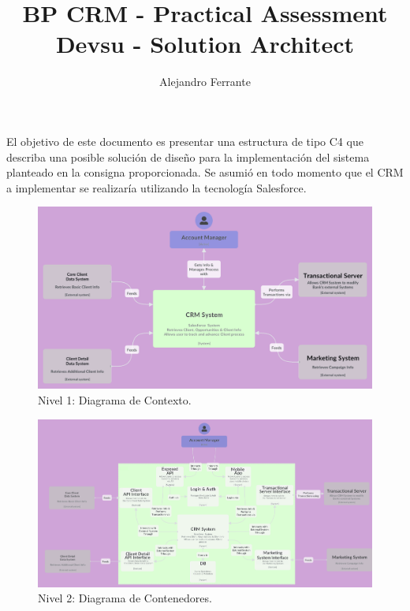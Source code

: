 \documentclass{article}
\title{BP CRM - Practical Assessment Devsu - Solution Architect}
\author{Alejandro Ferrante}
\begin{document}
\maketitle


El objetivo de este documento es presentar una estructura de tipo C4 que describa una posible solución de diseño para la implementación del sistema planteado en la consigna proporcionada. Se asumió en todo momento que el CRM a implementar se realizaría utilizando la tecnología Salesforce.
\newline \newline

\begin{figure} [H]
\centering
\includegraphics[width=0.9\linewidth]{C1 Context.png}
\caption{\label{fig:C1}Nivel 1: Diagrama de Contexto.}
\end{figure}

\begin{figure} [H]
\centering
\includegraphics[width=0.9\linewidth]{C2 Containers.png}
\caption{\label{fig:C2}Nivel 2: Diagrama de Contenedores.}
\end{figure}
\end{document}
